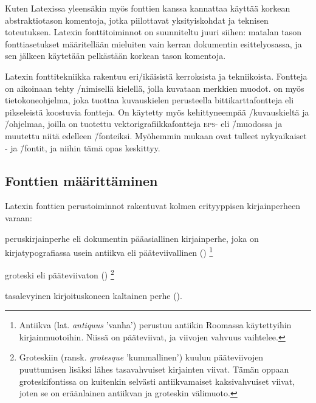 Kuten Latexissa yleensäkin myös fonttien kanssa kannattaa käyttää
korkean abstraktiotason komentoja, jotka piilottavat yksityiskohdat ja
teknisen toteutuksen. Latexin fonttitoiminnot on suunniteltu juuri
siihen: matalan tason fonttiasetukset määritellään mieluiten vain kerran
dokumentin esittelyosassa, ja sen jälkeen käytetään pelkästään korkean
tason komentoja.

Latexin fonttitekniikka rakentuu eri\-/ikäisistä kerroksista ja
tekniikoista. Fontteja on aikoinaan tehty
\-/nimisellä kielellä, jolla
kuvataan merkkien muodot.  on myös tietokoneohjelma,
joka tuottaa kuvauskielen perusteella bittikarttafontteja eli
pikseleistä koostuvia fontteja. On käytetty myös kehittyneempää
\-/kuvauskieltä ja \=/ohjelmaa,
joilla on tuotettu vektorigrafiikkafontteja \textsc{eps}- eli
 \=/muodossa ja muutettu niitä
edelleen  \=/fonteiksi. Myöhemmin mukaan
ovat tulleet nykyaikaiset - ja 
\=/fontit, ja niihin tämä opas keskittyy.

\subsection{Fonttien määrittäminen}
\label{luku:fontin_valinta}

Latexin fonttien perustoiminnot rakentuvat kolmen erityyppisen
kirjainperheen varaan:

\begin{nluetelma}
\item peruskirjainperhe eli dokumentin pääasiallinen kirjainperhe, joka
  on kirjatypografiassa usein antiikva eli pääteviivallinen
  ()%
  \footnote{Antiikva (lat. \emph{antiquus} 'vanha') perustuu antiikin
    Roomassa käytettyihin kirjainmuotoihin. Niissä on pääteviivat, ja
    viivojen vahvuus vaihtelee.}
\item groteski eli pääteviivaton ()%
  \footnote{Groteskiin (ransk. \emph{grotesque} 'kummallinen') kuuluu
    pääteviivojen puuttumisen lisäksi lähes tasavahvuiset kirjainten
    viivat. Tämän oppaan groteskifontissa on kuitenkin selvästi
    antiikvamaiset kaksivahvuiset viivat, joten se on eräänlainen
    antiikvan ja groteskin välimuoto.}
\item tasalevyinen kirjoituskoneen kaltainen perhe
  ().
\end{nluetelma}

